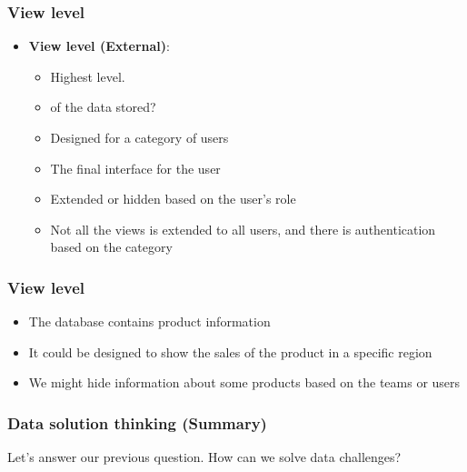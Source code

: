 \VideoClassification
\begin{frame}
	\frametitle{View level}
	\begin{itemize}[<+->]
		\item \textbf{View level (External)}: 
		\begin{itemize}[<+->]
			\item Highest level.
			\item \textbf{\underline{}} of the data stored? 
			\item Designed for a category of users
			\item The final interface for the user
			\item Extended or hidden based on the user's role
			\item Not all the views is extended to all users, and there is authentication based on the category
		\end{itemize}		
	\end{itemize}	
	
\end{frame}
\begin{frame}
	\frametitle{View level}
	\begin{example}
		\begin{itemize}[<+->]
			\item The database contains product information
			\item It could be designed to show the sales of the product in a specific region
			\item We might hide information about some products based on the teams or users
		\end{itemize}
	\end{example}
	
\end{frame}

\VideoClassification[column=2, colour=blue]
\begin{frame}[c]
	\frametitle{Data solution thinking (Summary) }
        \begin{center}
			Let's answer our previous question. How can we solve data challenges?
        \end{center}
    \end{frame}

